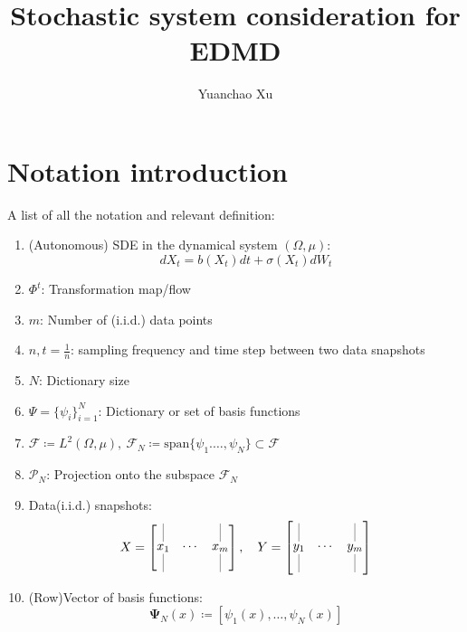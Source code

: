 \documentclass{article}[11]
\title{Stochastic system consideration for EDMD}
\author{Yuanchao Xu}
\begin{document}
	
	\maketitle
	
	\section{Notation introduction}
	A list of all the notation and relevant definition:
	\begin{enumerate}
		\item (Autonomous) SDE in the dynamical system $(\Omega, \mu)$:
		$$dX_t = b(X_t)dt + \sigma(X_t)dW_t$$
		
		\item $\Phi^{t}$: Transformation map/flow
		
		\item $m$: Number of (i.i.d.) data points
		
		\item $n,t=\frac{1}{n}$: sampling frequency and time step between two data snapshots
		
		\item $N$: Dictionary size
		
		\item $\Psi = \{\psi_i\}_{i=1}^N$: Dictionary or set of basis functions
		
		\item $\mathcal{F}\coloneqq L^2(\Omega, \mu), \ \mathcal{F}_N \coloneqq \text{span}\{\psi_1. \dots, \psi_N\}\subset\mathcal{F}$
		
		\item $\mathcal{P}_{N}$: Projection onto the subspace $\mathcal{F}_N$
		
		\item Data(i.i.d.) snapshots:
		\[
		X = \begin{bmatrix} 
			\underset{\rule{0.1mm}{5mm}}{\overset{\rule{0.1mm}{5mm}}{x_1}} & \cdots & \underset{\rule{0.1mm}{5mm}}{\overset{\rule{0.1mm}{5mm}}{x_m}}
		\end{bmatrix}
		, \quad
		Y = \begin{bmatrix} 
			\underset{\rule{0.1mm}{5mm}}{\overset{\rule{0.1mm}{5mm}}{y_1}} & \cdots & \underset{\rule{0.1mm}{5mm}}{\overset{\rule{0.1mm}{5mm}}{y_m}}
		\end{bmatrix}
		\]	
		
		\item (Row)Vector of basis functions:
		$$
		\mathbf{\Psi}_N(x) \coloneqq \left[\psi_1(x), \dots, \psi_N(x)\right]
		$$
		

\end{enumerate}
\end{document}
